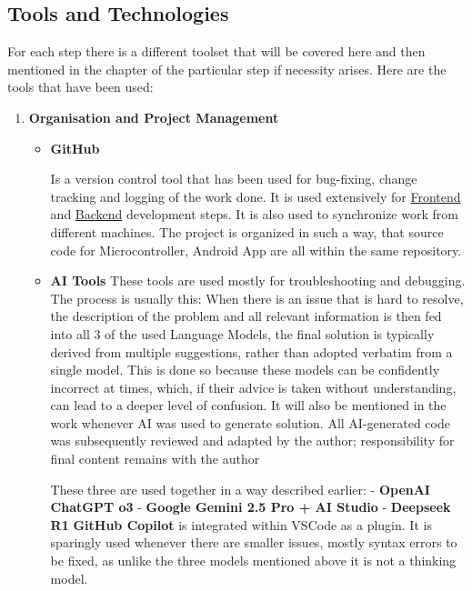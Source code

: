 \subsection{Tools and Technologies}
For each step there is a different toolset that will be covered here and then mentioned in the chapter of the particular step if necessity arises. Here are the tools that have been used:

\begin{enumerate}
	\item\textbf{Organisation and Project Management}
	\begin{itemize}
		\item\textbf{GitHub}
		
		Is a version control tool that has been used for bug-fixing, change tracking and logging of the work done. It is used extensively for \hyperref[sec:FrontenddDev]{Frontend} and \hyperref[sec:Backenddev]{Backend} development steps. It is also used to synchronize work from different machines. The project is organized in such a way, that source code for Microcontroller, Android App are all within the same repository.
		\item\textbf{AI Tools}
		\newline These tools are used mostly for troubleshooting and debugging. The process is usually this: When there is an issue that is hard to resolve, the description of the problem and all relevant information is then fed into all 3 of the used Language Models, the final solution is typically derived from multiple suggestions, rather than adopted verbatim from a single model. This is done so because these models can be confidently incorrect at times, which, if their advice is taken without understanding, can lead to a deeper level of confusion. It will also be mentioned in the work whenever AI was used to generate solution. All AI-generated code was subsequently reviewed and adapted by the author; responsibility for final content remains with the author
		
		These three are used together in a way described earlier:
		\newline - \textbf{OpenAI ChatGPT o3}
		\newline - \textbf{Google Gemini 2.5 Pro + AI Studio}
		\newline - \textbf{Deepseek R1}
		\newline \textbf{GitHub Copilot} is integrated within \ac{VSCode} as a plugin. It is sparingly used whenever there are smaller issues, mostly syntax errors to be fixed, as unlike the three models mentioned above it is not a thinking model.
		

\end{itemize}
\end{enumerate}
